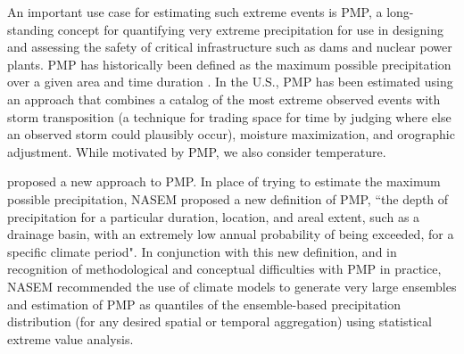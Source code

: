 \documentclass{ametsocV6.1}
\begin{document}


An important use case for estimating such extreme events is PMP, a long-standing concept for quantifying very extreme precipitation for use in designing and assessing the safety of critical infrastructure such as dams and nuclear power plants. %
PMP has historically been defined as the maximum possible precipitation over a given area and time duration \citep{nasem2024pmp}.
In the U.S., PMP has been estimated using an approach that combines %
a catalog of the most extreme observed events with storm transposition (a technique for trading space for time by judging where else an observed storm could plausibly occur), moisture maximization, and orographic adjustment. 
While motivated by PMP, we also consider temperature.

\cite{nasem2024pmp} proposed a new approach to PMP. 
In place of trying to estimate the maximum possible precipitation, NASEM proposed a new definition of PMP, ``the depth of precipitation for a particular duration, location, and areal extent, such as a drainage basin, with an extremely low annual probability of being exceeded, for a specific climate period".   
In conjunction with this new definition, and in recognition of methodological and conceptual difficulties with PMP in practice, NASEM recommended the use of climate models
to generate very large ensembles and estimation of PMP as quantiles of the ensemble-based precipitation distribution (for any desired spatial or temporal aggregation) using statistical extreme value analysis. 
\end{document}
